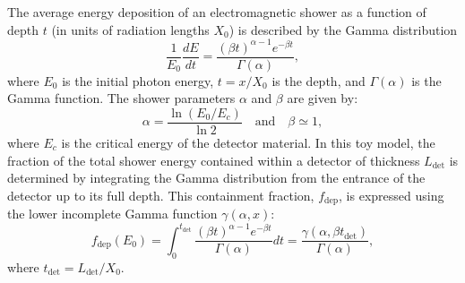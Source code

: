 \documentclass{aastex701}
\begin{document}
The average energy deposition of an electromagnetic shower as a function of depth $t$ (in units of radiation lengths $X_0$) is described by the Gamma distribution
\begin{equation}
\frac{1}{E_0}\frac{dE}{dt} = \frac{(\beta t)^{\alpha-1} e^{-\beta t}}{\Gamma(\alpha)},
\end{equation}
where $E_0$ is the initial photon energy, $t = x/X_0$ is the depth, and $\Gamma(\alpha)$ is the Gamma function. The shower parameters $\alpha$ and $\beta$ are given by:
\begin{equation}
\alpha = \frac{\ln(E_0/E_c)}{\ln 2} \quad \text{and} \quad \beta \simeq 1,
\end{equation}
where $E_c$ is the critical energy of the detector material. In this toy model, the fraction of the total shower energy contained within a detector of thickness $L_{\text{det}}$ is determined by integrating the Gamma distribution from the entrance of the detector up to its full depth. This containment fraction, $f_{\text{dep}}$, is expressed using the lower incomplete Gamma function $\gamma(\alpha, x)$:
\begin{equation}
f_{\text{dep}}(E_0) = \int_0^{t_{\text{det}}} \frac{(\beta t)^{\alpha-1} e^{-\beta t}}{\Gamma(\alpha)} dt = \frac{\gamma(\alpha, \beta t_{\text{det}})}{\Gamma(\alpha)},
\end{equation}
where $t_{\text{det}} = L_{\text{det}}/X_0$.
\end{document}
